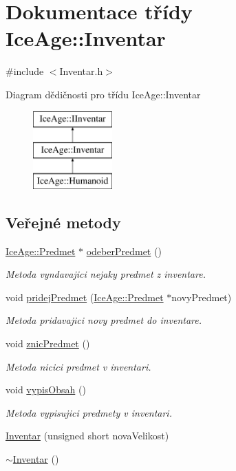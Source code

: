 \hypertarget{classIceAge_1_1Inventar}{}\section{Dokumentace třídy Ice\+Age\+:\+:Inventar}
\label{classIceAge_1_1Inventar}


{\ttfamily \#include $<$Inventar.\+h$>$}

Diagram dědičnosti pro třídu Ice\+Age\+:\+:Inventar\begin{figure}[H]
\begin{center}
\leavevmode
\includegraphics[height=3.000000cm]{d9/d41/classIceAge_1_1Inventar}
\end{center}
\end{figure}
\subsection*{Veřejné metody}
\begin{DoxyCompactItemize}
\item 
\hyperlink{classIceAge_1_1Predmet}{Ice\+Age\+::\+Predmet} $\ast$ \hyperlink{classIceAge_1_1Inventar_a3762d1e00c50d07ee89aaa97f7e37ffe}{odeber\+Predmet} ()
\begin{DoxyCompactList}\small\item\em Metoda vyndavajici nejaky predmet z inventare. \end{DoxyCompactList}\item 
void \hyperlink{classIceAge_1_1Inventar_a09802bba103ef43221b08f24f651b0c9}{pridej\+Predmet} (\hyperlink{classIceAge_1_1Predmet}{Ice\+Age\+::\+Predmet} $\ast$novy\+Predmet)
\begin{DoxyCompactList}\small\item\em Metoda pridavajici novy predmet do inventare. \end{DoxyCompactList}\item 
void \hyperlink{classIceAge_1_1Inventar_ade200c2239bc59e7da16e83c9461ff52}{znic\+Predmet} ()
\begin{DoxyCompactList}\small\item\em Metoda nicici predmet v inventari. \end{DoxyCompactList}\item 
void \hyperlink{classIceAge_1_1Inventar_a6706fcc99f644cea6c38a7e3126a6892}{vypis\+Obsah} ()
\begin{DoxyCompactList}\small\item\em Metoda vypisujici predmety v inventari. \end{DoxyCompactList}\item 
\hyperlink{classIceAge_1_1Inventar_aea775a478164c9be1855c22fc07934ea}{Inventar} (unsigned short nova\+Velikost)
\item 
\hyperlink{classIceAge_1_1Inventar_a2975c73519bf07dac86f20a6483d1f19}{$\sim$\+Inventar} ()
\end{DoxyCompactItemize}

